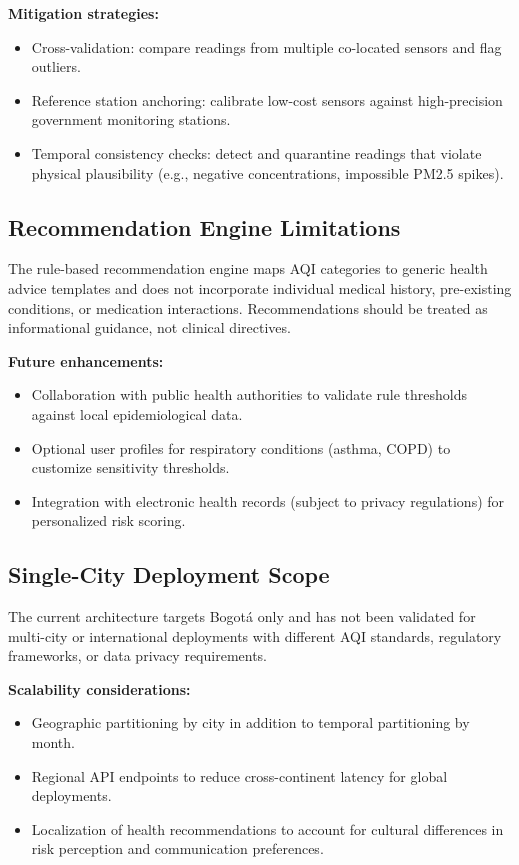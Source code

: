 \textbf{Mitigation strategies:}
\begin{itemize}
    \item Cross-validation: compare readings from multiple co-located sensors and flag outliers.
    \item Reference station anchoring: calibrate low-cost sensors against high-precision government monitoring stations.
    \item Temporal consistency checks: detect and quarantine readings that violate physical plausibility (e.g., negative concentrations, impossible PM2.5 spikes).
\end{itemize}

\subsection{Recommendation Engine Limitations}
The rule-based recommendation engine maps AQI categories to generic health advice templates and does not incorporate individual medical history, pre-existing conditions, or medication interactions. Recommendations should be treated as informational guidance, not clinical directives.

\textbf{Future enhancements:}
\begin{itemize}
    \item Collaboration with public health authorities to validate rule thresholds against local epidemiological data.
    \item Optional user profiles for respiratory conditions (asthma, COPD) to customize sensitivity thresholds.
    \item Integration with electronic health records (subject to privacy regulations) for personalized risk scoring.
\end{itemize}

\subsection{Single-City Deployment Scope}
The current architecture targets Bogotá only and has not been validated for multi-city or international deployments with different AQI standards, regulatory frameworks, or data privacy requirements.

\textbf{Scalability considerations:}
\begin{itemize}
    \item Geographic partitioning by city in addition to temporal partitioning by month.
    \item Regional API endpoints to reduce cross-continent latency for global deployments.
    \item Localization of health recommendations to account for cultural differences in risk perception and communication preferences.
\end{itemize}

